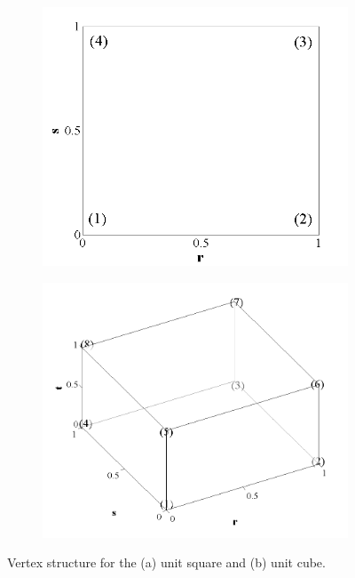 \begin{figure}
\centering
	\begin{subfigure}[b]{0.45\textwidth}
		\centering
		\label{subfig::unit_square}
		\includegraphics[width=\textwidth]{figures/sec_BF/unit_square_linear.png}
		\caption{}
	\end{subfigure}
	\hfill
	\begin{subfigure}[b]{0.45\textwidth}
		\centering
		\label{subfig::unit_cube}
		\includegraphics[width=\textwidth]{figures/sec_BF/unit_cube_linear.png}
		\caption{}
	\end{subfigure}
\caption{Vertex structure for the (a) unit square and (b) unit cube.}
\label{fig::unit_square_cude_linear}
\end{figure}

